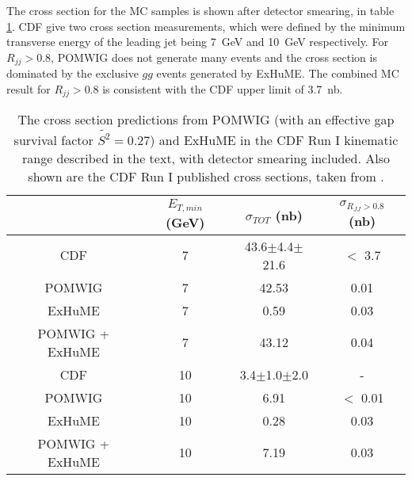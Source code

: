 
The cross section for the MC samples is shown after detector smearing, in table \ref{cdfrun1xs}. CDF give two cross section measurements, which were defined by the minimum transverse energy of the leading jet being   7~GeV and 10~GeV respectively. For $R_{jj} > 0.8$, POMWIG does not generate many events and the cross section is dominated by the exclusive $gg$ events generated by ExHuME. The combined MC result for $ R_{jj} > 0.8$ is consistent with the CDF upper limit of 3.7~nb. 

\begin{table}[t]
\centering
\begin{tabular}{| c | c | c | c |}
\hline
& $E_{T, min}$ (GeV)   & $\sigma_{TOT}$ (nb) & $\sigma_{R_{JJ} > 0.8}$ (nb) \\
\hline 
CDF & 7 & 43.6$\pm$4.4$\pm$21.6  & $<$ 3.7 \\
POMWIG & 7 & 42.53  & 0.01 \\ 
ExHuME & 7 &  0.59 & 0.03\\
POMWIG + ExHuME & 7 & 43.12 &  0.04  \\ 

\hline
CDF & 10 & 3.4$\pm$1.0$\pm$2.0 & - \\
POMWIG & 10 & 6.91 &  $<$ 0.01\\ 
ExHuME & 10 & 0.28 &  0.03\\
POMWIG + ExHuME & 10 & 7.19 &  0.03  \\ 
\hline
\end{tabular}
\caption[CDF Run I cross sections for POMWIG and ExHuME]{The cross section predictions from POMWIG (with an effective gap survival factor $\tilde{S^2} = 0.27$) and ExHuME in the CDF Run I kinematic range described in the text, with detector smearing included. Also shown are the CDF Run I 
published cross sections, taken from \cite{Affolder:2000hd}.\label{cdfrun1xs}}
\end{table}



